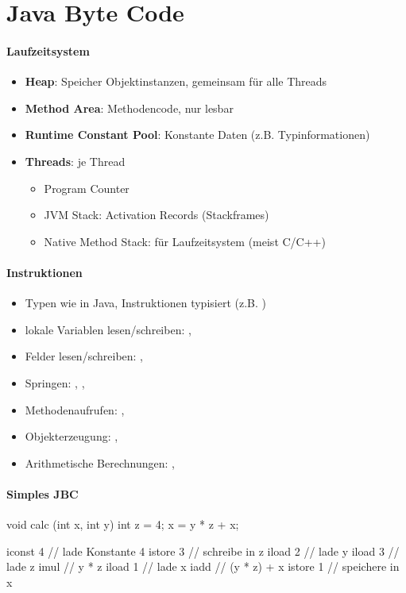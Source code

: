 \section{Java Byte Code}

\paragraph{Laufzeitsystem}
\begin{itemize}
  \item \textbf{Heap}: Speicher Objektinstanzen, gemeinsam für alle Threads
  \item \textbf{Method Area}: Methodencode, nur lesbar
  \item \textbf{Runtime Constant Pool}: Konstante Daten (z.B. Typinformationen)
  \item \textbf{Threads}: je Thread
  \begin{itemize}
    \item Program Counter
    \item JVM Stack: Activation Records (Stackframes)
    \item Native Method Stack: für Laufzeitsystem (meist C/C++)
  \end{itemize}
\end{itemize}

\paragraph{Instruktionen}
\begin{itemize}
  \item Typen wie in Java, Instruktionen typisiert (z.B. )
  \item lokale Variablen lesen/schreiben: , 
  \item Felder lesen/schreiben: , 
  \item Springen: , , 
  \item Methodenaufrufen: , 
  \item Objekterzeugung: , 
  \item Arithmetische Berechnungen: , 
\end{itemize}

\paragraph{Simples JBC}
\begin{java}
  void calc (int x, int y) {
    int z = 4;
    x = y * z + x;
  }
\end{java}
\begin{java}
  iconst 4 // lade Konstante 4
  istore 3 // schreibe in z
  iload 2 // lade y
  iload 3 // lade z
  imul // y * z
  iload 1 // lade x
  iadd // (y * z) + x
  istore 1 // speichere in x
\end{java}

